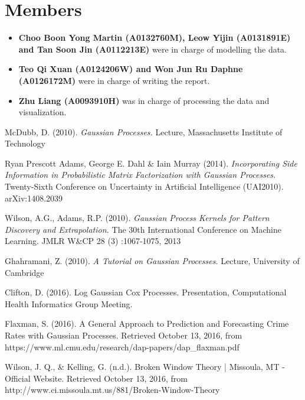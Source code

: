 \documentclass[a4paper, 10pt, conference]{ieeeconf}
\begin{document}
	\section{Members}
	\begin{itemize}
		\item {\bf Choo Boon Yong Martin (A0132760M), Leow Yijin (A0131891E) and Tan Soon Jin (A0112213E)} were in charge of modelling the data.
		\item {\bf Teo Qi Xuan (A0124206W) and Won Jun Ru Daphne (A0126172M)} were in charge of writing the report.
		\item {\bf Zhu Liang (A0093910H)} was in charge of processing the data and visualization.
	\end{itemize}

	\begin{thebibliography}{9}
	McDubb, D. (2010).
	\textit{Gaussian Processes.}
	Lecture, Massachusetts Institute of Technology
	
	Ryan Prescott Adams, George E. Dahl \& Iain Murray (2014).
	\textit{Incorporating Side Information in Probabilistic Matrix Factorization with Gaussian Processes.}
	Twenty-Sixth Conference on Uncertainty in Artificial Intelligence (UAI2010). arXiv:1408.2039

	Wilson, A.G., Adams, R.P. (2010).
	\textit{Gaussian Process Kernels for Pattern Discovery and Extrapolation.}
	The 30th International Conference on Machine Learning. JMLR W\&CP 28 (3) :1067-1075, 2013
	
	Ghahramani, Z. (2010).
	\textit{A Tutorial on Gaussian Processes.}
	Lecture, University of Cambridge
	
	Clifton, D. (2016).
	Log Gaussian Cox Processes. Presentation, Computational Health Informatics Group Meeting.

	Flaxman, S. (2016).
	A General Approach to Prediction and Forecasting Crime Rates with Gaussian Processes. Retrieved October 13, 2016, from https://www.ml.cmu.edu/research/dap-papers/dap\_flaxman.pdf

	Wilson, J. Q., \& Kelling, G. (n.d.).
	Broken Window Theory | Missoula, MT - Official Website. Retrieved October 13, 2016, from http://www.ci.missoula.mt.us/881/Broken-Window-Theory

	
	\end{thebibliography}
\end{document}

